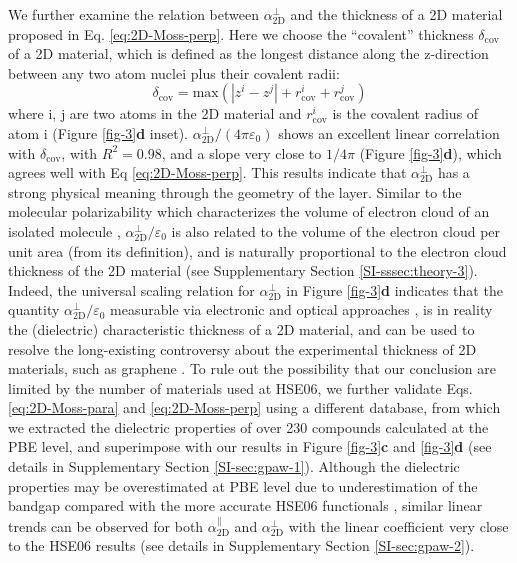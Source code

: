 \documentclass[journal=ancac3,manuscript=article,email=true,hyperref=true,keywords=false]{achemso}
\begin{document}
We further examine the relation between $\alpha_{\mathrm{2D}}^{\perp}$ and the
thickness of a 2D material proposed in
Eq. \ref{eq:2D-Moss-perp}. Here we choose the ``covalent'' thickness
$\delta_{\mathrm{cov}}$ of a 2D material, which is defined as the
longest distance along the z-direction between any two atom nuclei
plus their covalent radii:
%
%
\begin{equation}
  \label{eq:cov-thick}
  \delta_{\mathrm{cov}} = \mathrm{max}(|z^{i} - z^{j}|
  + r^{i}_{\mathrm{cov}} + r^{j}_{\mathrm{cov}})
\end{equation}
where i, j are two atoms in the 2D material and $r_{\mathrm{cov}}^{i}$
is the covalent radius of atom i (Figure \ref{fig-3}{\bf d} inset). 
%
%
$\alpha_{\mathrm{2D}}^{\perp}/(4 \pi \varepsilon_{0})$ shows an
excellent linear correlation with $\delta_{\mathrm{cov}}$, with
$R^{2}=0.98$, and a slope very close to $1/4\pi$ (Figure
\ref{fig-3}{\bf d}), which agrees well with Eq \ref{eq:2D-Moss-perp}.
This results indicate that $\alpha_{\mathrm{2D}}^{\perp}$ has a strong
physical meaning through the geometry of the layer.  Similar to the
molecular polarizability which characterizes the volume of electron
cloud of an isolated molecule \cite{Israelachvili_2011},
$\alpha_{\mathrm{2D}}^{\perp}/\varepsilon_{0}$ is also related to the
volume of the electron cloud per unit area (from its definition), and
is naturally proportional to the electron cloud thickness of the 2D
material (see Supplementary Section \ref{SI-sssec:theory-3}). Indeed, the
universal scaling relation for $\alpha_{\mathrm{2D}}^{\perp}$ in
Figure \ref{fig-3}{\bf d} indicates that the quantity
$\alpha_{\mathrm{2D}}^{\perp}/\varepsilon_{0}$ measurable via
electronic and optical approaches
\cite{Antoine_1999,Cherniavskaya_2003,Krauss_1999_EFM,Pedersen_2016,Klein_2016,Roch_2018},
is in reality the (dielectric) characteristic thickness of a 2D
material, and can be used to resolve the long-existing controversy
about the experimental thickness of 2D materials, such as graphene
\cite{Shearer_2016}.
%
To rule out the possibility that our conclusion are limited by the
number of materials used at HSE06, we further validate
Eqs. \ref{eq:2D-Moss-para} and \ref{eq:2D-Moss-perp} using a different
database\cite{Haastrup_2018}, from which we extracted the dielectric
properties of over 230 compounds calculated at the PBE level, and
superimpose with our results in Figure \ref{fig-3}{\bf c} and
\ref{fig-3}{\bf d} (see details in Supplementary Section
\ref{SI-sec:gpaw-1}). Although the dielectric properties may be
overestimated at PBE level due to underestimation of the bandgap
compared with the more accurate HSE06 functionals
\cite{Van_Dyck_2017}, similar linear trends can be observed for both
$\alpha^{\parallel}_{\mathrm{2D}}$ and $\alpha_{\mathrm{2D}}^{\perp}$
with the linear coefficient very close to the HSE06 results (see
details in Supplementary Section \ref{SI-sec:gpaw-2}).
\end{document}
